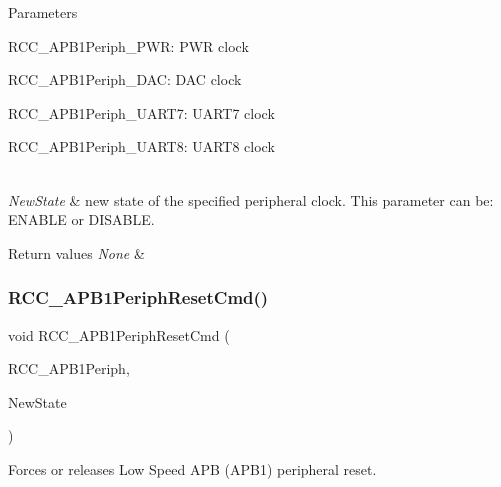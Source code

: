 \begin{DoxyParams}{Parameters}
\begin{DoxyItemize}
R\+C\+C\+\_\+\+A\+P\+B1\+Periph\+\_\+\+P\+WR\+: P\+WR clock \item R\+C\+C\+\_\+\+A\+P\+B1\+Periph\+\_\+\+D\+AC\+: D\+AC clock \item R\+C\+C\+\_\+\+A\+P\+B1\+Periph\+\_\+\+U\+A\+R\+T7\+: U\+A\+R\+T7 clock \item R\+C\+C\+\_\+\+A\+P\+B1\+Periph\+\_\+\+U\+A\+R\+T8\+: U\+A\+R\+T8 clock \end{DoxyItemize}
\\
\hline
{\em New\+State} & new state of the specified peripheral clock. This parameter can be\+: E\+N\+A\+B\+LE or D\+I\+S\+A\+B\+LE. \\
\hline
\end{DoxyParams}

\begin{DoxyRetVals}{Return values}
{\em None} & \\
\hline
\end{DoxyRetVals}
\mbox{\label{group___r_c_c_gab197ae4369c10b92640a733b40ed2801}} 
\subsubsection{\texorpdfstring{R\+C\+C\+\_\+\+A\+P\+B1\+Periph\+Reset\+Cmd()}{RCC\_APB1PeriphResetCmd()}}
{\footnotesize\ttfamily void R\+C\+C\+\_\+\+A\+P\+B1\+Periph\+Reset\+Cmd (\begin{DoxyParamCaption}\item[{uint32\+\_\+t}]{R\+C\+C\+\_\+\+A\+P\+B1\+Periph,  }\item[{Functional\+State}]{New\+State }\end{DoxyParamCaption})}



Forces or releases Low Speed A\+PB (A\+P\+B1) peripheral reset. 


